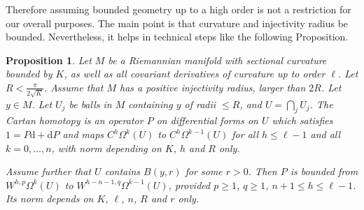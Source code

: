 \documentclass[11pt]{article}
\newtheorem{prop}[theo]{Proposition}
\theoremstyle{definition}
\numberwithin{equation}{section}
\numberwithin{figure}{section}
\numberwithin{table}{section}
\newcommand{\dd}{\mathrm{d}}
\begin{document}
Therefore assuming bounded geometry up to a high order is not a restriction for our overall purposes. The main point is that curvature and injectivity radius be bounded. Nevertheless, it helps in technical steps like the following Proposition.

\begin{prop}\label{local}
Let $M$ be a Riemannian manifold with sectional curvature bounded by $K$, as well as all covariant derivatives of curvature up to order $\ell$. Let $R<\frac{\pi}{2\sqrt{K}}$. Assume that $M$ has a positive injectivity radius, larger than $2R$. Let $y\in M$. Let $U_j$ be balls in $M$ containing $y$ of radii $\leq R$, and $U=\bigcap_j U_j$. The Cartan homotopy is an operator $P$ on differential forms on $U$ which satisfies $1=P\dd+\dd P$ and maps $C^h\Omega^{k}(U)$ to $C^h\Omega^{k-1}(U)$ for all $h\leq \ell -1$ and all $k=0,\dots,n$, with norm depending on $K$, $h$ and $R$ only.

Assume further that $U$ contains $B(y,r)$ for some $r>0$. Then $P$ is bounded from $W^{h,p}\Omega^{k}(U)$ to $W^{h -n-1,q}\Omega^{k-1}(U)$, provided $p\geq 1$, $q\geq 1$, $n+1 \leq h \leq \ell-1$. Its norm depends on $K$, $\ell$, $n$, $R$ and $r$ only.
\end{prop}
\end{document}
